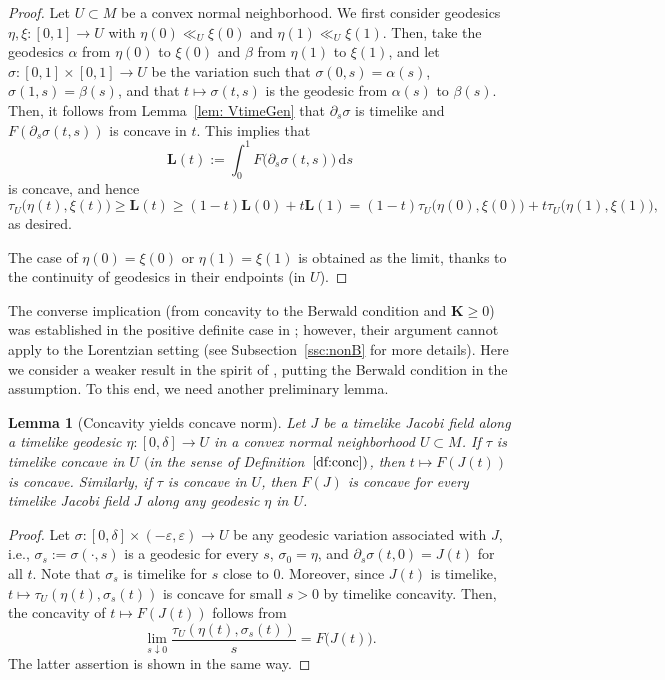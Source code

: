 \documentclass[a4paper,11pt]{article}
\numberwithin{equation}{section}
\theoremstyle{definition}
\theoremstyle{plain}
\newtheorem{lemma}[definition]{Lemma}
\newcommand{\del}{\partial}
\newcommand{\lra}{\longrightarrow}
\newcommand{\ve}{\varepsilon}
\newcommand{\bK}{\mathbf{K}}
\newcommand{\bL}{\mathbf{L}}
\newcommand{\dd}{\mathrm{d}}
\begin{document}
\begin{proof}
Let $U \subset M$ be a convex normal neighborhood.
We first consider geodesics $\eta,\xi\colon [0,1] \lra U$ with $\eta(0) \ll_U \xi(0)$ and $\eta(1) \ll_U \xi(1)$.
Then, take the geodesics $\alpha$ from $\eta(0)$ to $\xi(0)$ and $\beta$ from $\eta(1)$ to $\xi(1)$,
and let $\sigma\colon [0,1] \times [0,1] \lra U$ be the variation such that $\sigma(0,s)=\alpha(s)$, $\sigma(1,s)=\beta(s)$, and that $t \longmapsto \sigma(t,s)$ is the geodesic from $\alpha(s)$ to $\beta(s)$.
Then, it follows from Lemma~\ref{lem: VtimeGen} that $\del_s \sigma$ is timelike and $F(\del_s \sigma(t,s))$ is concave in $t$.
This implies that
\[ \bL(t):=\int_0^1 F\bigl( \del_s \sigma(t,s) \bigr) \,\dd s \] is concave, and hence
\[ \tau_U \bigl( \eta(t),\xi(t) \bigr) \geq \bL(t)
\geq (1-t)\bL(0) + t\bL(1)
=(1-t)\tau_U \bigl( \eta(0),\xi(0) \bigr) + t\tau_U \bigl( \eta(1),\xi(1) \bigr), \]
as desired.

The case of $\eta(0)=\xi(0)$ or $\eta(1)=\xi(1)$ is obtained as the limit, thanks to the continuity of geodesics in their endpoints (in $U$). 
\end{proof}

The converse implication (from concavity to the Berwald condition and $\bK \ge 0$)
was established in the positive definite case in \cite{IL}; however,
their argument cannot apply to the Lorentzian setting (see Subsection~\ref{ssc:nonB} for more details).
Here we consider a weaker result in the spirit of \cite{KK}, putting the Berwald condition in the assumption. 
To this end, we need another preliminary lemma. 

\begin{lemma}[Concavity yields concave norm]
\label{lem:ConcavityJacobiField}
Let $J$ be a timelike Jacobi field along a timelike geodesic $\eta\colon [0,\delta] \lra U$ in a convex normal neighborhood $U \subset M$.
If $\tau$ is timelike concave in $U$ $($in the sense of Definition~$\ref{df:conc})$, then $t \longmapsto F(J(t))$ is concave.
Similarly, if $\tau$ is concave in $U$, then $F(J)$ is concave for every timelike Jacobi field $J$ along any geodesic $\eta$ in $U$.
\end{lemma}

\begin{proof}
Let $\sigma\colon [0,\delta] \times (-\ve,\ve) \lra U$ be any geodesic variation associated with $J$, i.e.,
$\sigma_s:=\sigma(\cdot,s)$ is a geodesic for every $s$, $\sigma_0=\eta$,
and $\del_s \sigma(t,0)=J(t)$ for all $t$.
Note that $\sigma_s$ is timelike for $s$ close to $0$.
Moreover, since $J(t)$ is timelike,
$t \longmapsto \tau_U(\eta(t),\sigma_s(t))$ is concave for small $s>0$ by timelike concavity.
Then, the concavity of $t \longmapsto F(J(t))$ follows from
\[ \lim_{s \downarrow 0} \frac{\tau_U(\eta(t),\sigma_s(t))}{s} =F\bigl( J(t) \bigr). \]
The latter assertion is shown in the same way.
\end{proof}
\end{document}
